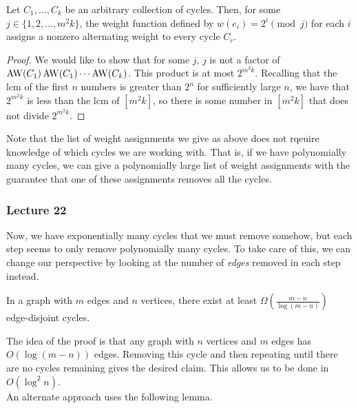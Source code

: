 			\begin{fprop}
				Let $C_1,\ldots,C_k$ be an arbitrary collection of cycles. Then, for some $j \in \{1,2,\ldots,m^2k\}$, the weight function defined by $w(e_i) = 2^i \pmod j$ for each $i$ assigns a nonzero alternating weight to every cycle $C_r$.
			\end{fprop}
			\begin{proof}
				We would like to show that for some $j$, $j$ is not a factor of $\operatorname{AW}(C_1) \operatorname{AW}(C_1) \cdots \operatorname{AW}(C_k)$. This product is at most $2^{m^2k}$. Recalling that the lcm of the first $n$ numbers is greater than $2^n$ for sufficiently large $n$, we have that $2^{m^2k}$ is less than the lcm of $[m^2k]$, so there is some number in $[m^2k]$ that does not divide $2^{m^2k}$.
			\end{proof}

			Note that the list of weight assignments we give as above does not rqeuire knowledge of which cycles we are working with. That is, if we have polynomially many cycles, we can give a polynomially large list of weight assignments with the guarantee that one of these assignments removes all the cycles.


		\subsubsection{Lecture 22}

			Now, we have exponentially many cycles that we must remove somehow, but each step seems to only remove polynomially many cycles. To take care of this, we can change our perspective by looking at the number of \emph{edges} removed in each step instead.

			\begin{flem}
				In a graph with $m$ edges and $n$ vertices, there exist at least $\Omega\left(\frac{m-n}{\log(m-n)}\right)$ edge-disjoint cycles.
			\end{flem}
			The idea of the proof is that any graph with $n$ vertices and $m$ edges has $O(\log(m-n))$ edges. Removing this cycle and then repeating until there are no cycles remaining gives the desired claim.
			This allows us to be done in $O(\log^2 n)$.\\
			An alternate approach uses the following lemma.

